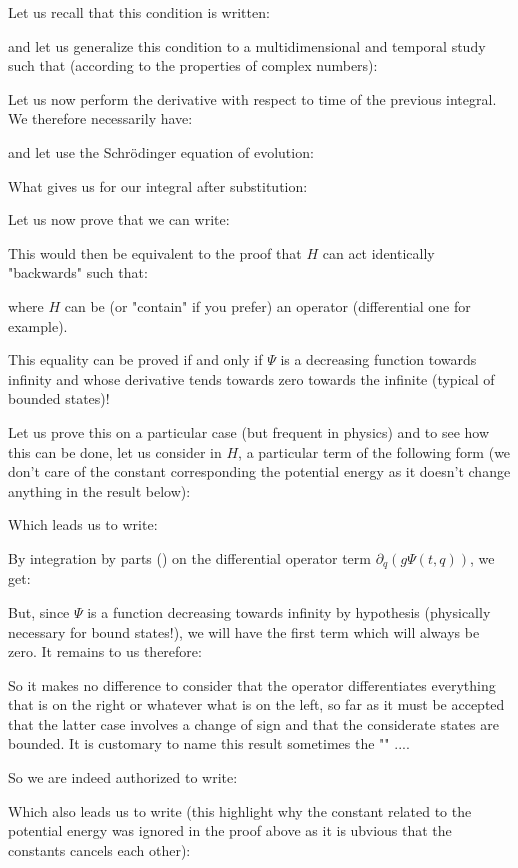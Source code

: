	Let us recall that this condition is written:
	
	and let us generalize this condition to a multidimensional and temporal study such that (according to the properties of complex numbers):
	
	Let us now perform the derivative with respect to time of the previous integral. We therefore necessarily have:
	
	and let use the Schrödinger equation of evolution:
	
	What gives us for our integral after substitution:
	
	Let us now prove that we can write:
	
	This would then be equivalent to the proof that $H$ can act identically "backwards" such that:
	
	where $H$ can be (or "contain" if you prefer) an operator (differential one for example).
	
	This equality can be proved if and only if $\Psi$ is a decreasing function  towards infinity and whose derivative tends towards zero towards the infinite (typical of bounded states)!
	
	Let us prove this on a particular case (but frequent in physics) and to see how this can be done, let us consider in $H$, a particular term of the following form (we don't care of the constant corresponding the potential energy as it doesn't change anything in the result below):
	
	Which leads us to write:
	
	By integration by parts () on the differential operator term $\partial_q (g\Psi(t,q))$, we get:
	
	But, since $\Psi$  is a function decreasing towards infinity by hypothesis (physically necessary for bound states!), we will have the first term which will always be zero. It remains to us therefore:
	
	So it makes no difference to consider that the operator differentiates everything that is on the right or whatever what is on the left, so far as it must be accepted that the latter case involves a change of sign and that the considerate states are bounded. It is customary to name this result sometimes the "" ....
	
	So we are indeed authorized to write:
	
	Which also leads us to write (this highlight why the constant related to the potential energy was ignored in the proof above as it is ubvious that the constants cancels each other):
	
